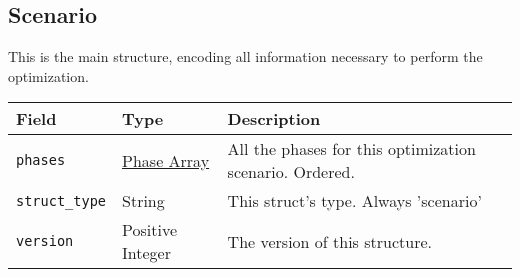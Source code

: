 \documentclass{article}
\begin{document}
		\subsection{Scenario}
			This is the main structure, encoding all information necessary to perform the optimization.

			\vspace{\baselineskip}

			\begin{tabular}{ p{} | p{} | p{197pt}}
				Field                    & Type                               & Description                                      \\ \hline
				\lstinline|phases| & \raggedright \hyperref[sec:phase]{Phase Array} & All the phases for this optimization scenario.
				                                                                Ordered.                                         \\[1ex]
				\lstinline|struct_type|  & String                             & This struct's type. Always 'scenario'            \\[1ex]
				\lstinline|version|      & \raggedright Positive Integer      & The version of this structure.
			\end{tabular}
\end{document}
